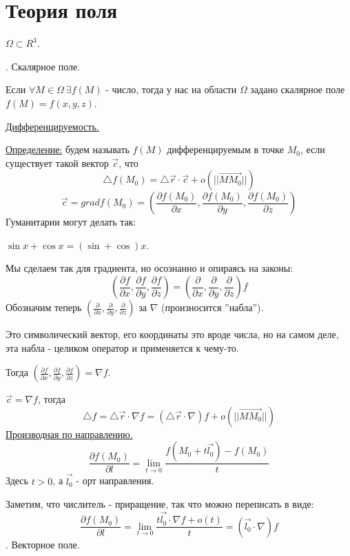 \documentclass[12pt]{article}
\begin{document}
\section{Теория поля}
$\Omega \subset R^3$.\par
{}. Скалярное поле.\par
Если $\forall M \in \Omega \ \exists f(M)$ - число, тогда у нас на области $\Omega$ задано скалярное поле $f(M) = f(x,y,z)$.\par
\uline{Дифференцируемость.}\par
\uline{Определение:} будем называть $f(M)$ дифференцируемым в точке $M_0$, если существует такой вектор $\overrightarrow{c}$, что
$${\bigtriangleup f}(M_0) = {\bigtriangleup \overrightarrow{r}} \cdot \overrightarrow{c} + o(||\overrightarrow{MM_0}||)$$
$$\overrightarrow{c} = grad f(M_0) = (\frac{\partial f(M_0)}{\partial x}, \frac{\partial f(M_0)}{\partial y}, \frac{\partial f(M_0)}{\partial z})$$
Гуманитарии могут делать так:\par
$\sin x + \cos x = (\sin+\cos)x$.\par
Мы сделаем так для градиента, но осознанно и опираясь на законы:
$$(\frac{\partial f}{\partial x},\frac{\partial f}{\partial y}, \frac{\partial f}{\partial z}) = (\frac{\partial}{\partial x},\frac{\partial}{\partial y},\frac{\partial}{\partial z})f$$
Обозначим теперь $(\frac{\partial}{\partial x},\frac{\partial}{\partial y},\frac{\partial}{\partial z})$ за $\nabla$ (произносится ''набла'').\par
Это символический вектор, его координаты это вроде числа, но на самом деле, эта набла - целиком оператор и применяется к чему-то.\par
Тогда $(\frac{\partial f}{\partial x},\frac{\partial f}{\partial y}, \frac{\partial f}{\partial z}) = {\nabla f}$.\par
$\overrightarrow{c} = {\nabla f}$, тогда
$${\bigtriangleup f} = {\bigtriangleup \overrightarrow{r}} \cdot {\nabla f} = ({\bigtriangleup \overrightarrow{r}} \cdot {\nabla})f + o(||\overrightarrow{MM_0}||)$$
\uline{Производная по направлению.}
$$\frac{\partial f (M_0)}{\partial l} = \lim_{t\to 0} \frac{f(M_0+t\overrightarrow{l_0})-f(M_0)}{t}$$
Здесь $t > 0$, а $\overrightarrow{l_0}$ - орт направления.\par
Заметим, что числитель - приращение, так что можно переписать в виде:
$$\frac{\partial f (M_0)}{\partial l} = \lim_{t\to 0} \frac{t \overrightarrow{l_0} \cdot \nabla f + o(t)}{t} = (\overrightarrow{l_0} \cdot \nabla)f$$
. Векторное поле.\par
\end{document}
